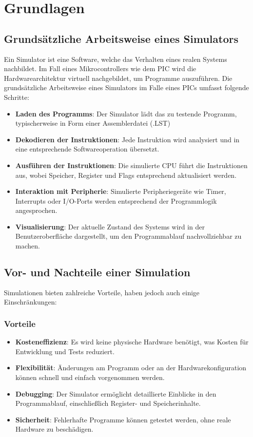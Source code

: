 \documentclass[a4paper,11pt]{report}
\begin{document}
\chapter{Grundlagen}

\section{Grundsätzliche Arbeitsweise eines Simulators}

Ein Simulator ist eine Software, welche das Verhalten eines realen Systems nachbildet. Im Fall eines Mikrocontrollers wie dem PIC wird die Hardwarearchitektur virtuell nachgebildet, um Programme auszuführen. Die grundsätzliche Arbeitsweise eines Simulators im Falle eines PICs umfasst folgende Schritte:

\begin{itemize}
    \item \textbf{Laden des Programms}: Der Simulator lädt das zu testende Programm, typischerweise in Form einer Assemblerdatei (.LST) 
    \item \textbf{Dekodieren der Instruktionen}: Jede Instruktion wird analysiert und in eine entsprechende Softwareoperation übersetzt.
    \item \textbf{Ausführen der Instruktionen}: Die simulierte CPU führt die Instruktionen aus, wobei Speicher, Register und Flags entsprechend aktualisiert werden.
    \item \textbf{Interaktion mit Peripherie}: Simulierte Peripheriegeräte wie Timer, Interrupts oder I/O-Ports werden entsprechend der Programmlogik angesprochen.
    \item \textbf{Visualisierung}: Der aktuelle Zustand des Systems wird in der Benutzeroberfläche dargestellt, um den Programmablauf nachvollziehbar zu machen.
\end{itemize}

\section{Vor- und Nachteile einer Simulation}

Simulationen bieten zahlreiche Vorteile, haben jedoch auch einige Einschränkungen:

\subsection*{Vorteile}
\begin{itemize}
    \item \textbf{Kosteneffizienz}: Es wird keine physische Hardware benötigt, was Kosten für Entwicklung und Tests reduziert.
    \item \textbf{Flexibilität}: Änderungen am Programm oder an der Hardwarekonfiguration können schnell und einfach vorgenommen werden.
    \item \textbf{Debugging}: Der Simulator ermöglicht detaillierte Einblicke in den Programmablauf, einschließlich Register- und Speicherinhalte.
    \item \textbf{Sicherheit}: Fehlerhafte Programme können getestet werden, ohne reale Hardware zu beschädigen.
\end{itemize}
\end{document}
